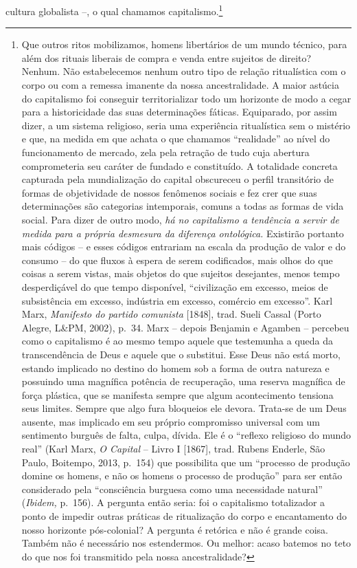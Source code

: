 cultura globalista --, o qual chamamos capitalismo.\footnote{Que outros
  ritos mobilizamos, homens libertários de um mundo técnico, para além
  dos rituais liberais de compra e venda entre sujeitos de direito?
  Nenhum. Não estabelecemos nenhum outro tipo de relação ritualística
  com o corpo ou com a remessa imanente da nossa ancestralidade. A maior
  astúcia do capitalismo foi conseguir territorializar todo um horizonte
  de modo a cegar para a historicidade das suas determinações fáticas.
  Equiparado, por assim dizer, a um sistema religioso, seria uma
  experiência ritualística sem o mistério e que, na medida em que achata
  o que chamamos ``realidade'' ao nível do funcionamento de mercado,
  zela pela retração de tudo cuja abertura comprometeria seu caráter de
  fundado e constituído. A totalidade concreta capturada pela
  mundialização do capital obscureceu o perfil transitório de formas de
  objetividade de nossos fenômenos sociais e fez crer que suas
  determinações são categorias intemporais, comuns a todas as formas de
  vida social. Para dizer de outro modo, \emph{há no capitalismo a
  tendência a servir de medida para a própria desmesura da diferença
  ontológica.} Existirão portanto mais códigos -- e esses códigos
  entrariam na escala da produção de valor e do consumo -- do que fluxos
  à espera de serem codificados, mais olhos do que coisas a serem
  vistas, mais objetos do que sujeitos desejantes, menos tempo
  desperdiçável do que tempo disponível, ``civilização em excesso, meios
  de subsistência em excesso, indústria em excesso, comércio em
  excesso''. Karl Marx, \emph{Manifesto do partido comunista}
  {[}1848{]}, trad. Sueli Cassal (Porto Alegre, L\&PM, 2002), p.~34.
  Marx -- depois Benjamin e Agamben -- percebeu como o capitalismo é ao
  mesmo tempo aquele que testemunha a queda da transcendência de Deus e
  aquele que o substitui. Esse Deus não está morto, estando implicado no
  destino do homem sob a forma de outra natureza e possuindo uma
  magnífica potência de recuperação, uma reserva magnífica de força
  plástica, que se manifesta sempre que algum acontecimento tensiona
  seus limites. Sempre que algo fura bloqueios ele devora. Trata-se de
  um Deus ausente, mas implicado em seu próprio compromisso universal
  com um sentimento burguês de falta, culpa, dívida. Ele é o ``reflexo
  religioso do mundo real'' (Karl Marx, \emph{O Capital} -- Livro I
  {[}1867{]}, trad. Rubens Enderle, São Paulo, Boitempo, 2013, p.~154)
  que possibilita que um ``processo de produção domine os homens, e não
  os homens o processo de produção'' para ser então considerado pela
  ``consciência burguesa como uma necessidade natural'' (\emph{Ibidem,}
  p.~156). A pergunta então seria: foi o capitalismo totalizador a ponto
  de impedir outras práticas de ritualização do corpo e encantamento do
  nosso horizonte pós-colonial? A pergunta é retórica e não é grande
  coisa. Também não é necessário nos estendermos. Ou melhor: acaso
  batemos no teto do que nos foi transmitido pela nossa ancestralidade?}

